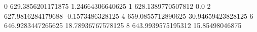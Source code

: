 0 629.3856201171875 1.24664306640625
1 628.1389770507812 0.0
2 627.9816284179688 -0.1573486328125
4 659.0855712890625 30.94659423828125
6 646.9283447265625 18.78936767578125
8 643.9939575195312 15.85498046875
